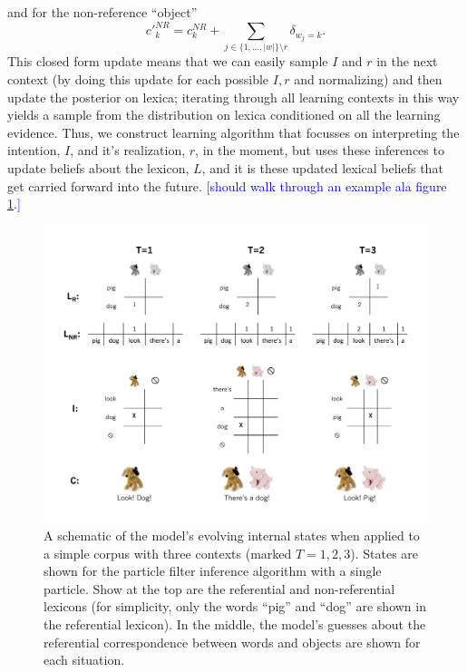 \documentclass[man,noapacite,12pt]{apa2}
\newcommand{\nnote}[1]{\textcolor{blue}{[#1]}}
\begin{document}


and for the non-reference ``object''
$$
c'^{NR}_{k} = c^{NR}_{k} + \sum_{j \in \{1,\dots,|w|\} \setminus r} \delta_{w_{j}=k}.
$$
This closed form update means that we can easily sample $I$ and $r$ in the next context (by doing this update for each possible $I,r$ and normalizing) and then update the posterior on lexica; iterating through all learning contexts in this way yields a sample from the distribution on lexica conditioned on all the learning evidence.
%
Thus, we construct learning algorithm that focusses on interpreting the intention, $I$, and it's realization, $r$, in the moment, but uses these inferences to update beliefs about the lexicon, $L$, and it is these updated lexical beliefs that get carried forward into the future. \nnote{should walk through an example ala figure \ref{fig:inference_diagram}.}

\begin{figure}[h!]
\begin{center}
\includegraphics[width=6.25in]{figures/inference_diagram.pdf}
\caption{\label{fig:inference_diagram} A schematic of the model's evolving internal states when applied to a simple corpus with three contexts (marked $T=1,2,3$). States are shown for the particle filter inference algorithm with a single particle. Show at the top are the referential and non-referential lexicons (for simplicity, only the words ``pig'' and ``dog'' are shown in the referential lexicon). In the middle, the model's guesses about the referential correspondence between words and objects are shown for each situation.}
\end{center}
\end{figure}
\end{document}
